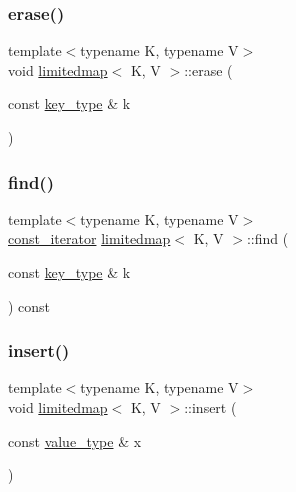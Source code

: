 \mbox{\label{classlimitedmap_aaf2fa41d8f7591d93e5010cf8c351de6}} 
\subsubsection{\texorpdfstring{erase()}{erase()}}
{\footnotesize\ttfamily template$<$typename K, typename V$>$ \\
void \mbox{\hyperlink{classlimitedmap}{limitedmap}}$<$ K, V $>$\+::erase (\begin{DoxyParamCaption}\item[{const \mbox{\hyperlink{classlimitedmap_aebf71255c65df699225cdcefe88717b9}{key\+\_\+type}} \&}]{k }\end{DoxyParamCaption})\hspace{0.3cm}{\ttfamily [inline]}}

\mbox{\label{classlimitedmap_acc9d08f77369c57ef2ce22788b146a8e}} 
\subsubsection{\texorpdfstring{find()}{find()}}
{\footnotesize\ttfamily template$<$typename K, typename V$>$ \\
\mbox{\hyperlink{classlimitedmap_ab0a3e4f2ec7c82359300c83a35ae2500}{const\+\_\+iterator}} \mbox{\hyperlink{classlimitedmap}{limitedmap}}$<$ K, V $>$\+::find (\begin{DoxyParamCaption}\item[{const \mbox{\hyperlink{classlimitedmap_aebf71255c65df699225cdcefe88717b9}{key\+\_\+type}} \&}]{k }\end{DoxyParamCaption}) const\hspace{0.3cm}{\ttfamily [inline]}}

\mbox{\label{classlimitedmap_af68570a54d74e1b168908be6e8cfb85c}} 
\subsubsection{\texorpdfstring{insert()}{insert()}}
{\footnotesize\ttfamily template$<$typename K, typename V$>$ \\
void \mbox{\hyperlink{classlimitedmap}{limitedmap}}$<$ K, V $>$\+::insert (\begin{DoxyParamCaption}\item[{const \mbox{\hyperlink{classlimitedmap_a8a6c4972e628b71bf43eeb757dafdce5}{value\+\_\+type}} \&}]{x }\end{DoxyParamCaption})\hspace{0.3cm}{\ttfamily [inline]}}

